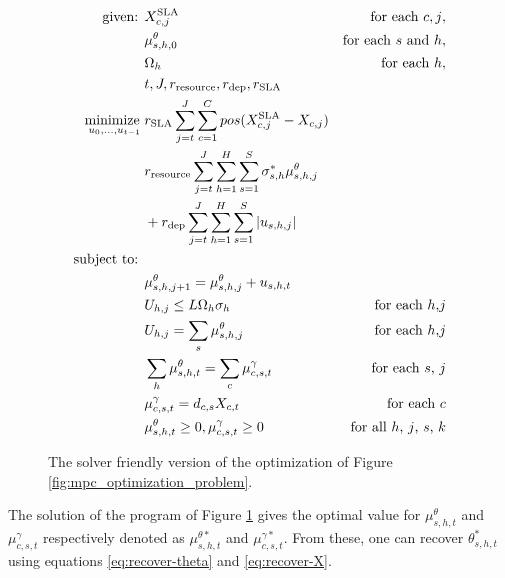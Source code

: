 \begin{figure}
\begin{spacing}{1}
\begin{align*} 
 \text{given: }   
  &  X_{c,j}^\text{SLA} & \text{for each $c,j$}, \\
  &  \mu_{s,h,0}^\theta & \text{for each $s$ and $h$}, \\ 
  & \Omega_{h} & \text{for each $h$}, \\ 
  & t,J,r_{\text{resource}},  r_{\text{dep}}, r_{\text{SLA}}  \\   
  \underset{u_0,...,u_{t-1}} {\text{minimize } } 
  & r_{\text{SLA}} \sum^{J}_{j=t} \sum^C_{c=1}  pos(X_{c,j}^\text{SLA}-X_{c,j})  \\
  &r_{\text{resource}} \sum^{J}_{j=t} \sum^H_{h=1} \sum^S_{s=1}  \sigma^*_{s,h} \mu_{s,h,j}^\theta \\
  & + r_{\text{dep}}  \sum^{J}_{j=t} \sum^H_{h=1} \sum^S_{s=1} |u_{s,h,j} |   \\ 
\text{subject to: } \\ 
&  \mu_{s,h,j+1}^\theta = \mu_{s,h,j}^\theta +  u_{s,h,t}  \nonumber \\
& U_{h,j} \le  L \Omega_{h} \sigma_h & \text{for each $h$,$j$} \nonumber \\ 
& U_{h,j} = \sum_s \mu_{s,h,j}^\theta  & \text{for each $h$,$j$} \nonumber  \\
& \sum_h \mu_{s,h,t}^\theta = \sum_c \mu_{c,s,t}^\gamma     &  \text{for each $s$, $j$} \nonumber \\  
& \mu_{c,s,t}^\gamma = d_{c,s} X_{c,t}  &	\text{for each $c$}   \\
&  \mu_{s,h,t}^\theta \ge 0 ,  \mu_{c,s,t}^\gamma \ge 0 & \text{for all $h$, $j$, $s$, $k$}   \\ 
\end{align*} 
\end{spacing} 
\caption[The solver friendly version of the MPC optimization.]{The solver friendly version of the optimization of Figure \ref{fig:mpc_optimization_problem}.} 
\label{fig:solver_friendly} 
\end{figure}

The solution of the program of Figure \ref{fig:solver_friendly} gives the optimal value for 
$\mu_{s,h,t}^\theta$ and $\mu_{c,s,t}^{\gamma}$ respectively denoted as
$\mu_{s,h,t}^{\theta *}$ and $\mu_{c,s,t}^{\gamma*}$. 
From these, one can recover $\theta_{s,h,t}^{*}$
using equations \ref{eq:recover-theta} and \ref{eq:recover-X}. 

